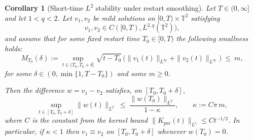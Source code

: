 \documentclass[12pt]{article}
\newcommand{\T}{\mathbb{T}}
\newtheorem{corollary}[theorem]{Corollary}
\theoremstyle{remark}
\theoremstyle{remark}
\begin{document}
\begin{corollary}[Short-time $L^2$ stability under restart smoothing]\label{cor:B}
Let $T\in(0,\infty]$ and let $1<q<2$.
Let $v_1,v_2$ be mild solutions on $[0,T)\times\T^2$ satisfying
\[
v_1,v_2\in C([0,T),L^{2,q}(\T^2)),
\]
and assume that for some fixed restart time $T_0\in[0,T)$ the following smallness holds:
\begin{equation}\label{eq:Md-small}
M_{T_0}(\delta):=\sup_{t\in(T_0,T_0+\delta]}
\sqrt{t-T_0}\,\bigl(\|v_1(t)\|_{L^\infty}+\|v_2(t)\|_{L^\infty}\bigr)
\ \le\ m,
\end{equation}
for some $\delta\in(0,\min\{1,T-T_0\})$ and some $m\ge 0$.

Then the difference $w=v_1-v_2$ satisfies, on $[T_0,T_0+\delta]$,
\begin{equation}\label{eq:stability-est}
\sup_{t\in[T_0,T_0+\delta]}\|w(t)\|_{L^2}
\ \le\
\frac{\|w(T_0)\|_{L^2}}{1-\kappa},
\qquad
\kappa:=C\pi\, m,
\end{equation}
where $C$ is the constant from the kernel bound $\|K_{\mathrm{per}}(t)\|_{L^1}\le C t^{-1/2}$.
In particular, if $\kappa<1$ then $v_1\equiv v_2$ on $[T_0,T_0+\delta]$ whenever $w(T_0)=0$.
\end{corollary}
\end{document}
